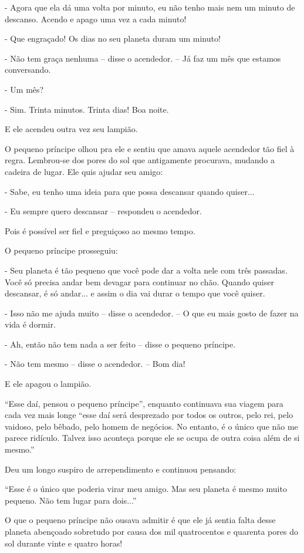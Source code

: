 - Agora que ela dá uma volta por minuto, eu não tenho mais nem um minuto
de descanso. Acendo e apago uma vez a cada minuto!

- Que engraçado! Os dias no seu planeta duram um minuto!

- Não tem graça nenhuma -- disse o acendedor. -- Já faz um mês que
estamos conversando.

- Um mês?

- Sim. Trinta minutos. Trinta dias! Boa noite.

E ele acendeu outra vez seu lampião.

O pequeno príncipe olhou pra ele e sentiu que amava aquele acendedor tão
fiel à regra. Lembrou-se dos pores do sol que antigamente procurava,
mudando a cadeira de lugar. Ele quis ajudar seu amigo:

- Sabe, eu tenho uma ideia para que possa descansar quando quiser...

- Eu sempre quero descansar -- respondeu o acendedor.

Pois é possível ser fiel e preguiçoso ao mesmo tempo.

O pequeno príncipe prosseguiu:

- Seu planeta é tão pequeno que você pode dar a volta nele com três
passadas. Você só precisa andar bem devagar para continuar no chão.
Quando quiser descansar, é só andar... e assim o dia vai durar o tempo
que você quiser.

- Isso não me ajuda muito -- disse o acendedor. -- O que eu mais gosto
de fazer na vida é dormir.

- Ah, então não tem nada a ser feito -- disse o pequeno príncipe.

- Não tem mesmo -- disse o acendedor. -- Bom dia!

E ele apagou o lampião.

``Esse daí, pensou o pequeno príncipe'', enquanto continuava sua viagem
para cada vez mais longe ``esse daí será desprezado por todos os outros,
pelo rei, pelo vaidoso, pelo bêbado, pelo homem de negócios. No entanto,
é o único que não me parece ridículo. Talvez isso aconteça porque ele se
ocupa de outra coisa além de si mesmo.''

Deu um longo suspiro de arrependimento e continuou pensando:

``Esse é o único que poderia virar meu amigo. Mas seu planeta é mesmo
muito pequeno. Não tem lugar para dois...''

O que o pequeno príncipe não ousava admitir é que ele já sentia falta
desse planeta abençoado sobretudo por causa dos mil quatrocentos e
quarenta pores do sol durante vinte e quatro horas!

